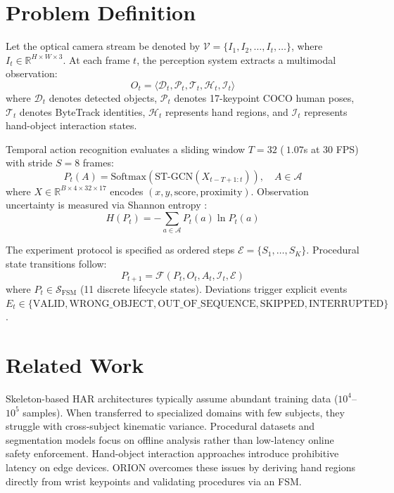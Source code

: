 \documentclass[journal,twocolumn]{IEEEtran}
\begin{document}
\section{Problem Definition}
Let the optical camera stream be denoted by $\mathcal{V} = \{I_1, I_2, \dots, I_t, \dots\}$, where $I_t \in \mathbb{R}^{H \times W \times 3}$. At each frame $t$, the perception system extracts a multimodal observation:
\begin{equation}
O_t = \langle \mathcal{D}_t, \mathcal{P}_t, \mathcal{T}_t, \mathcal{H}_t, \mathcal{I}_t \rangle
\end{equation}
where $\mathcal{D}_t$ denotes detected objects, $\mathcal{P}_t$ denotes 17-keypoint COCO human poses, $\mathcal{T}_t$ denotes ByteTrack identities, $\mathcal{H}_t$ represents hand regions, and $\mathcal{I}_t$ represents hand-object interaction states.

Temporal action recognition evaluates a sliding window $T=32$ ($~1.07$s at 30 FPS) with stride $S=8$ frames:
\begin{equation}
P_t(A) = \text{Softmax}\left(\text{ST-GCN}(X_{t-T+1:t})\right), \quad A \in \mathcal{A}
\end{equation}
where $X \in \mathbb{R}^{B \times 4 \times 32 \times 17}$ encodes $(x, y, \text{score}, \text{proximity})$. Observation uncertainty is measured via Shannon entropy \cite{shannon1948mathematical}:
\begin{equation}
H(P_t) = -\sum_{a \in \mathcal{A}} P_t(a) \ln P_t(a)
\end{equation}

The experiment protocol is specified as ordered steps $\mathcal{E} = \{S_1, \dots, S_K\}$. Procedural state transitions follow:
\begin{equation}
P_{t+1} = \mathcal{F}(P_t, O_t, A_t, \mathcal{I}_t, \mathcal{E})
\end{equation}
where $P_t \in \mathcal{S}_{\text{FSM}}$ (11 discrete lifecycle states). Deviations trigger explicit events $E_t \in \{\text{VALID}, \text{WRONG\_OBJECT}, \text{OUT\_OF\_SEQUENCE}, \text{SKIPPED}, \text{INTERRUPTED}\}$.

\section{Related Work}
Skeleton-based HAR architectures \cite{yan2018spatial, shi2019two, chen2021channel} typically assume abundant training data ($10^4$--$10^5$ samples). When transferred to specialized domains with few subjects, they struggle with cross-subject kinematic variance. Procedural datasets \cite{kuehne2014capture, tang2019coin, damen2022rescaling, grauman2022ego4d, sener2022assembly101} and segmentation models \cite{farha2019ms} focus on offline analysis rather than low-latency online safety enforcement. Hand-object interaction approaches \cite{chao2018rethinking, tamura2021qpic} introduce prohibitive latency on edge devices. ORION overcomes these issues by deriving hand regions directly from wrist keypoints and validating procedures via an FSM.
\end{document}

